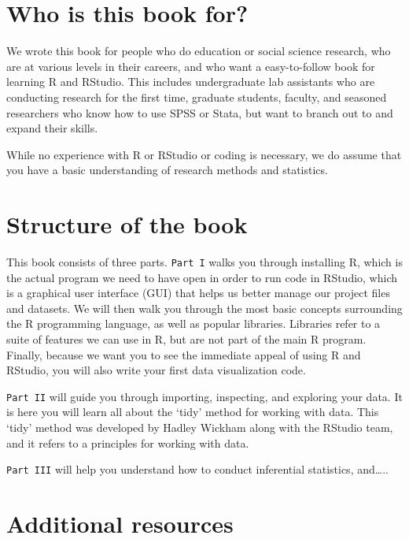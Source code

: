 \documentclass[
]{book}
\begin{document}
\hypertarget{who-is-this-book-for}{%
\section{Who is this book for?}\label{who-is-this-book-for}}

We wrote this book for people who do education or social science research, who are at various levels in their careers, and who want a easy-to-follow book for learning R and RStudio. This includes undergraduate lab assistants who are conducting research for the first time, graduate students, faculty, and seasoned researchers who know how to use SPSS or Stata, but want to branch out to and expand their skills.

While no experience with R or RStudio or coding is necessary, we do assume that you have a basic understanding of research methods and statistics.

\hypertarget{structure-of-the-book}{%
\section{Structure of the book}\label{structure-of-the-book}}

This book consists of three parts. \texttt{Part\ I} walks you through installing R, which is the actual program we need to have open in order to run code in RStudio, which is a graphical user interface (GUI) that helps us better manage our project files and datasets. We will then walk you through the most basic concepts surrounding the R programming language, as well as popular libraries. Libraries refer to a suite of features we can use in R, but are not part of the main R program. Finally, because we want you to see the immediate appeal of using R and RStudio, you will also write your first data visualization code.

\texttt{Part\ II} will guide you through importing, inspecting, and exploring your data. It is here you will learn all about the `tidy' method for working with data. This `tidy' method was developed by Hadley Wickham along with the RStudio team, and it refers to a principles for working with data.

\texttt{Part\ III} will help you understand how to conduct inferential statistics, and\ldots..

\hypertarget{additional-resources}{%
\section{Additional resources}\label{additional-resources}}
\end{document}
